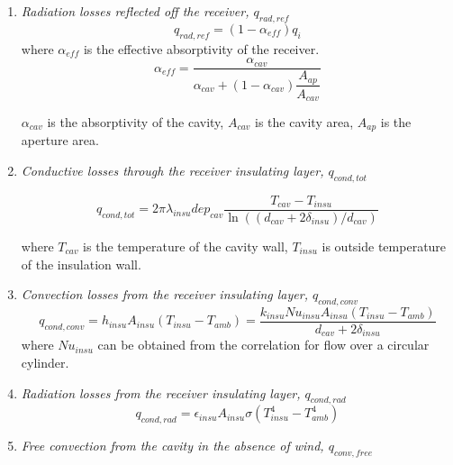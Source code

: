 \begin{enumerate}[label=(\arabic*)]
  \item \emph{Radiation losses reflected off the receiver, $q_{rad,ref}$}
  \begin{equation}
    q_{rad,ref}=(1-\alpha_{eff})q_{i}
\end{equation}
    where $\alpha_{eff}$ is the effective absorptivity of the receiver.    
    \begin{equation}
    \alpha_{eff}=\frac{\alpha_{cav}}{\alpha_{cav}+(1-\alpha_{cav})\dfrac{A_{ap}}{A_{cav}}}
    \end{equation}
    
    $\alpha_{cav}$ is the absorptivity of the cavity, $A_{cav}$ is the cavity area, $A_{ap}$ is the aperture area.
  \item \emph{Conductive losses through the receiver insulating layer, $q_{cond,tot}$}
  
  \begin{equation}
q_{cond,tot}=2\pi\lambda_{insu}dep_{cav}\dfrac{T_{cav}-T_{insu}}{\ln((d_{cav}+2\delta_{insu})/d_{cav})}
    \end{equation}
    
    where $T_{cav}$ is the temperature of the cavity wall, $T_{insu}$
is outside temperature of the insulation wall.

  \item \emph{Convection losses from the receiver insulating layer, $q_{cond,conv}$}  
  \begin{equation}
	q_{cond,conv}=h_{insu}A_{insu}(T_{insu}-T_{amb})
	=\dfrac{k_{insu}Nu_{insu}A_{insu}(T_{insu}-T_{amb})}{d_{cav}+2\delta_{insu}}
\end{equation}
where $Nu_{insu}$ can be obtained from the correlation for flow over a circular cylinder.~\cite{Churchill1977}

  \item \emph{Radiation losses from the receiver insulating layer, $q_{cond,rad}$}  
  \begin{equation}
	q_{cond,rad}=\epsilon_{insu}A_{insu}\sigma(T_{insu}^4 - T_{amb}^4)
\end{equation}
  \item \emph{Free convection from the cavity in the absence of wind, $q_{conv,free}$}
    

\end{enumerate}
